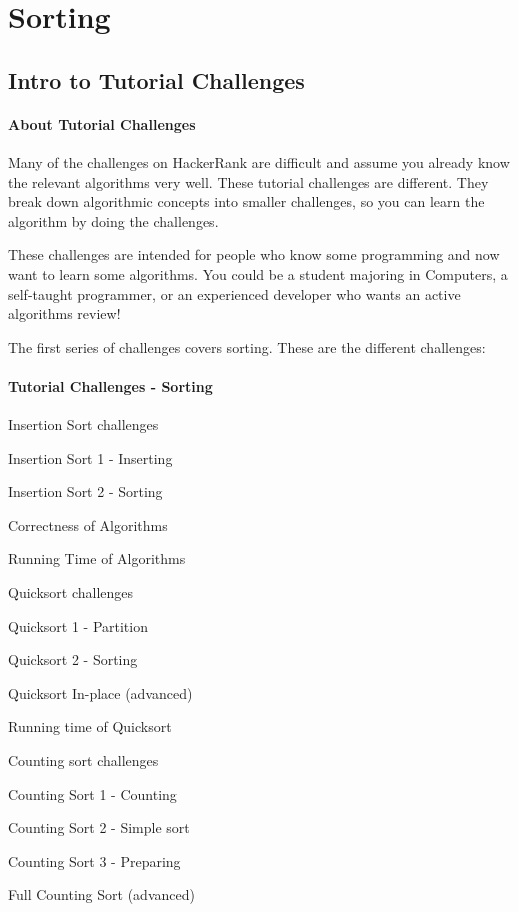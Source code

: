 \chapter{Sorting}

\section{Intro to Tutorial Challenges} %
\label{sec:Intro-to-Tutorial-Challenges}


\subsubsection{About Tutorial Challenges}
Many of the challenges on HackerRank are difficult and assume you already know the relevant algorithms very well. These tutorial challenges are different. They break down algorithmic concepts into smaller challenges, so you can learn the algorithm by doing the challenges.

These challenges are intended for people who know some programming and now want to learn some algorithms. You could be a student majoring in Computers, a self-taught programmer, or an experienced developer who wants an active algorithms review!

The first series of challenges covers sorting. These are the different challenges:


\subsubsection{Tutorial Challenges - Sorting}
Insertion Sort challenges
\begindot
\item Insertion Sort 1 - Inserting
\item Insertion Sort 2 - Sorting
\item Correctness of Algorithms
\item Running Time of Algorithms
\myenddot

Quicksort challenges
\begindot
\item Quicksort 1 - Partition
\item Quicksort 2 - Sorting
\item Quicksort In-place (advanced)
\item Running time of Quicksort
\myenddot

Counting sort challenges
\begindot
\item Counting Sort 1 - Counting
\item Counting Sort 2 - Simple sort
\item Counting Sort 3 - Preparing
\item Full Counting Sort (advanced)
\myenddot

